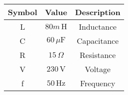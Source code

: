 \begin{tabular}{|c|c|c|}
	\hline
	\textbf{Symbol} & \textbf{Value} &
	\textbf{Description}\\[6pt]
	\hline
	L &  $80m\,
	\text{H}$ & Inductance\\[6pt]
	\hline 
	C &  $60\, \mu\text{F}$ & Capacitance \\[6pt]
	\hline
	R &  $15\, \Omega$ & Resistance\\[6pt]
	\hline
	V & $230\, \text{V}$ & Voltage\\[6pt]
	\hline
	f & $50\, \text{Hz}$ & Frequency\\[6pt]
	\hline
\end{tabular}